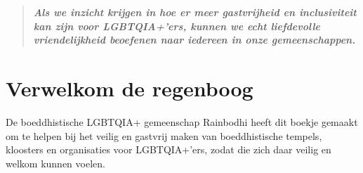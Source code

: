\documentclass[12pt,openany]{book}
\begin{document}
\begin{figure}[h]
    \centering
\end{figure}

\begin{quote}
\centering
\doublespacing
\textit{\Large \textbf{Als we inzicht krijgen in hoe er meer gastvrijheid en inclusiviteit kan zijn voor LGBTQIA+'ers, kunnen we echt liefdevolle vriendelijkheid beoefenen naar iedereen in onze gemeenschappen.}}
\end{quote}
\color{black}

\setlength{\parindent}{15pt}
\chapter*{Verwelkom de regenboog}

\begin{figure}
\end{figure}
De boeddhistische LGBTQIA+ gemeenschap Rainbodhi heeft dit boekje gemaakt om  te helpen bij het veilig en gastvrij maken van boeddhistische tempels, kloosters en organisaties voor LGBTQIA+'ers, zodat die zich daar veilig en welkom kunnen voelen.
\end{document}
